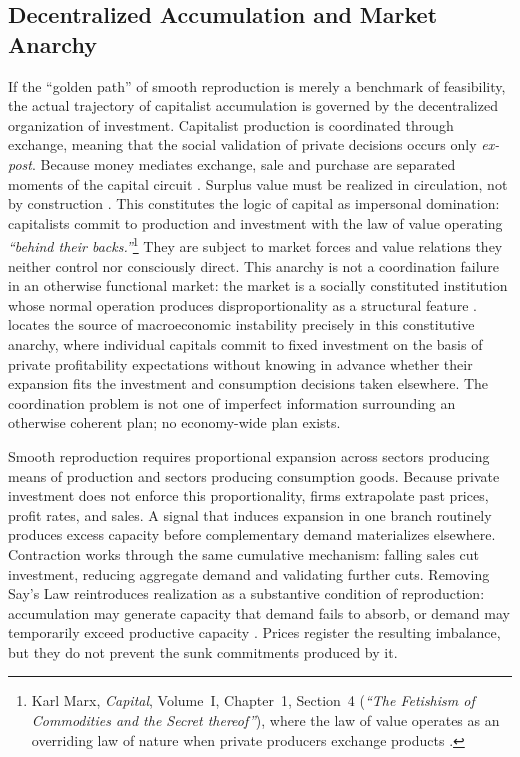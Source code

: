 \subsection{Decentralized Accumulation and Market Anarchy}

If the ``golden path'' of smooth reproduction is merely a
benchmark of feasibility, the actual trajectory of capitalist
accumulation is governed by the decentralized organization of
investment. Capitalist production is coordinated through
exchange, meaning that the social validation of private
decisions occurs only \textit{ex-post}. Because money mediates
exchange, sale and purchase are separated moments of the capital
circuit \citep{Basu2022}. Surplus value must be realized in
circulation, not by construction \citep{Foley1985, Trigg2020}.
This constitutes the logic of capital as impersonal domination:
capitalists commit to production and investment with the law of
value operating \textit{``behind their backs.''}\footnote{Karl
	Marx, \textit{Capital}, Volume~I, Chapter~1, Section~4 (\textit{``The
	Fetishism of Commodities and the Secret thereof''}), where the
	law of value operates as an overriding law of nature when
	private producers exchange products \citep{MarxKVI}.} They are subject to market
forces and value relations they neither control nor consciously
direct. This anarchy is not a coordination failure in an
otherwise functional market: the market is a socially
constituted institution whose normal operation produces
disproportionality as a structural feature
\citep{VidalPeck2012}. \citet{Okishio2022} locates the source
of macroeconomic instability precisely in this constitutive
anarchy, where individual capitals commit to fixed investment
on the basis of private profitability expectations without knowing
in advance whether their expansion fits the investment and consumption
decisions taken elsewhere. The coordination problem is not one
of imperfect information surrounding an otherwise coherent plan;
no economy-wide plan exists.

Smooth reproduction requires proportional expansion across
sectors producing means of production and sectors producing
consumption goods. Because private investment does not enforce
this proportionality, firms extrapolate past prices, profit
rates, and sales. A signal that induces expansion in one branch
routinely produces excess capacity before complementary demand
materializes elsewhere. Contraction works through the same
cumulative mechanism: falling sales cut investment, reducing
aggregate demand and validating further cuts. Removing Say's
Law reintroduces realization as a substantive condition of
reproduction: accumulation may generate capacity that demand
fails to absorb, or demand may temporarily exceed productive
capacity \citep{Foley1985}. Prices register the
resulting imbalance, but they do not prevent the sunk
commitments produced by it.


